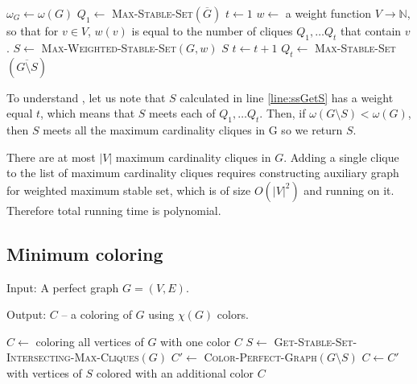 \begin{algorithmic}[1]
    \ls $\omega_G \gets \omega(G)$
    \ls $Q_1 \gets$ \textsc{Max-Stable-Set}$(\overline{G})$
    \ls $t \gets 1$
      \ls $w \gets$ a weight function $V \rightarrow \mathbb{N}$, so that for $v \in V$, $w(v)$ is equal to
      \lsx the number of cliques $Q_1, \ldots Q_t$ that contain $v$.
      \ls $S \gets$ \textsc{Max-Weighted-Stable-Set}$(G, w)$ \label{line:ssGetS}
        \ls \RETURN $S$
      \mElse
        \ls $t \gets t+1$ \vspace{-.1cm}
        \ls $Q_t \gets$ \textsc{Max-Stable-Set}$(\overline{G \setminus S})$
      \mEndIf
    \mEndWhile
  \mEndProcedure
\end{algorithmic}

To understand , let us note that $S$ calculated in line \ref{line:ssGetS} has a weight equal $t$, which means that $S$ meets each of $Q_1, \ldots Q_t$. Then, if $\omega(G \setminus S) < \omega(G)$, then $S$ meets all the maximum cardinality cliques in G so we return $S$.

There are at most $|V|$ maximum cardinality cliques in $G$. Adding a single clique to the list of maximum cardinality cliques requires constructing auxiliary graph for weighted maximum stable set, which is of size $O(|V|^2)$ and running  on it. Therefore total running time is polynomial.

\subsection{Minimum coloring}

\begin{alg}
  \label{alg:minColoring}
  Input: A perfect graph $G = (V, E)$.

  \noindent Output: $C$ -- a coloring of $G$ using $\chi(G)$ colors.
\end{alg}

\begin{algorithmic}[1]
    \ls $C \gets$ coloring all vertices of $G$ with one color
    \ls \RETURN $C$
  \mElse
    \ls $S \gets$ \textsc{Get-Stable-Set-Intersecting-Max-Cliques}$(G)$
    \ls $C' \gets$ \textsc{Color-Perfect-Graph}$(G \setminus S)$
    \ls $C \gets C'$ with vertices of $S$ colored with an additional color
    \ls \RETURN $C$
  \mEndIf
  \mEndProcedure
\end{algorithmic}

